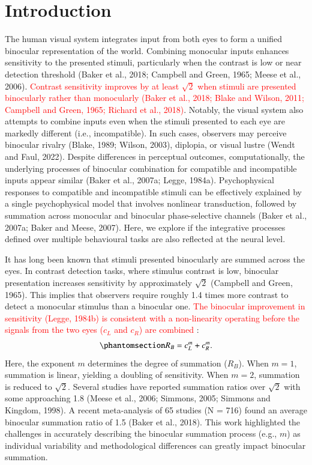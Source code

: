 \documentclass[review,
  12pt,
]{elsarticle}
\begin{document}
\linenumbers
\section{Introduction}\label{introduction}

The human visual system integrates input from both eyes to form a
unified binocular representation of the world. Combining monocular
inputs enhances sensitivity to the presented stimuli, particularly when
the contrast is low or near detection threshold (Baker et al., 2018;
Campbell and Green, 1965; Meese et al., 2006). \textcolor{red}{Contrast
sensitivity improves by at least \(\sqrt{2}\) when stimuli are presented
binocularly rather than monocularly (Baker et al., 2018; Blake and
Wilson, 2011; Campbell and Green, 1965; Richard et al., 2018)}. Notably,
the visual system also attempts to combine inputs even when the stimuli
presented to each eye are markedly different (i.e., incompatible). In
such cases, observers may perceive binocular rivalry (Blake, 1989;
Wilson, 2003), diplopia, or visual lustre (Wendt and Faul, 2022).
Despite differences in perceptual outcomes, computationally, the
underlying processes of binocular combination for compatible and
incompatible inputs appear similar (Baker et al., 2007a; Legge, 1984a).
Psychophysical responses to compatible and incompatible stimuli can be
effectively explained by a single psychophysical model that involves
nonlinear transduction, followed by summation across monocular and
binocular phase-selective channels (Baker et al., 2007a; Baker and
Meese, 2007). Here, we explore if the integrative processes defined over
multiple behavioural tasks are also reflected at the neural level.

It has long been known that stimuli presented binocularly are summed
across the eyes. In contrast detection tasks, where stimulus contrast is
low, binocular presentation increases sensitivity by approximately
\(\sqrt{2}\) (Campbell and Green, 1965). This implies that observers
require roughly 1.4 times more contrast to detect a monocular stimulus
than a binocular one. \textcolor{red}{The binocular improvement in sensitivity
(Legge, 1984b) is consistent with a non-linearity operating before the
signals from the two eyes (\(c_L\) and \(c_R\)) are combined} :
\begin{equation}\phantomsection\label{eq-IntroMath1}{
R_B = c_L^m + c_R^m.
}\end{equation} Here, the exponent \(m\) determines the degree of
summation (\(R_B\)). When \(m = 1\), summation is linear, yielding a
doubling of sensitivity. When \(m = 2\), summation is reduced to
\(\sqrt{2}\). Several studies have reported summation ratios over
\(\sqrt{2}\) with some approaching 1.8 (Meese et al., 2006; Simmons,
2005; Simmons and Kingdom, 1998). A recent meta-analysis of 65 studies
(N = 716) found an average binocular summation ratio of 1.5 (Baker et
al., 2018). This work highlighted the challenges in accurately
describing the binocular summation process (e.g., \(m\)) as individual
variability and methodological differences can greatly impact binocular
summation.
\end{document}
